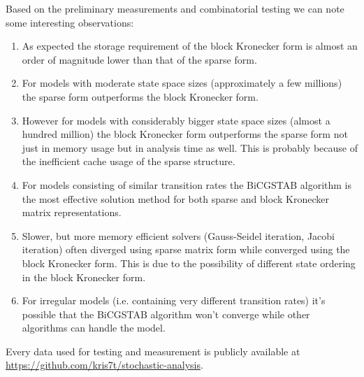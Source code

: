 \begin{obs}
	Based on the preliminary measurements and combinatorial testing we can note some interesting observations:

	\begin{enumerate}
		\item As expected the storage requirement of the block Kronecker form is almost an order of magnitude lower than that of the sparse form. 

		\item For models with moderate state space sizes (approximately a few millions) the sparse form outperforms the block Kronecker form.

		\item However for models with considerably bigger state space sizes (almost a hundred million) the block Kronecker form outperforms the sparse form not just in memory usage but in analysis time as well. This is probably because of the inefficient cache usage of the sparse structure.

		\item For models consisting of similar transition rates the BiCGSTAB algorithm is the most effective solution method for both sparse and block Kronecker matrix representations. 

		\item Slower, but more memory efficient solvers (Gauss-Seidel iteration, Jacobi iteration) often diverged using sparse matrix form while converged using the block Kronecker form. This is due to the possibility of different state ordering in the block Kronecker form.  

		\item For irregular models (i.e. containing very different transition rates) it's possible that the BiCGSTAB algorithm won't converge while other algorithms can handle the model.
	\end{enumerate}
\end{obs}

Every data used for testing and measurement is publicly available at
\url{https://github.com/kris7t/stochastic-analysis}.